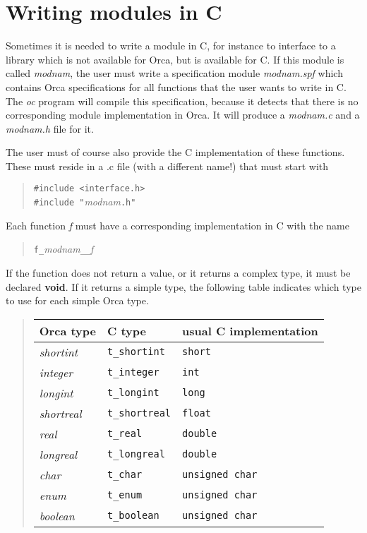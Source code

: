 \documentclass[10pt]{article}
\begin{document}

\section{Writing modules in C}\label{sec:interface}

Sometimes it is needed to write a module in C, for instance to interface
to a library which is not available for Orca, but is available for C.
If this module is called
{\em modnam},
the user must write a specification module
{\em modnam.spf}
which
contains Orca specifications for all functions that the user wants to write
in C.
The
{\em oc}
program will compile this specification, because it detects that there
is no corresponding module implementation in Orca.
It will produce a 
{\em modnam.c}
and a
{\em modnam.h}
file for it.

The user must of course also provide the C implementation of these functions.
These must reside in a .c file (with a different name!) that must
start with
\begin{quote}
\verb+#include <interface.h>+ \\
\verb+#include "+{\em modnam}\verb+.h"+
\end{quote}
Each function {\em f}
must have a corresponding implementation in C with the name
\begin{quote}
\verb+f_+{\em modnam}\verb+__+{\em f}
\end{quote}
If the function does not return a value, or it returns a complex type,
it must be declared
{\bf void}.
If it returns a simple type, the following table indicates which type
to use for each simple Orca type.

\begin{quote}
\begin{tabular}{|l|l|l|}\hline
{\bf Orca type} & {\bf C type} & {\bf usual C implementation} \\ \hline
{\em shortint} & \verb+t_shortint+ & \verb+short+ \\
{\em integer} & \verb+t_integer+ & \verb+int+ \\
{\em longint} & \verb+t_longint+ & \verb+long+ \\
{\em shortreal} & \verb+t_shortreal+ & \verb+float+ \\
{\em real} & \verb+t_real+ & \verb+double+ \\
{\em longreal} & \verb+t_longreal+ & \verb+double+ \\
{\em char} & \verb+t_char+ & \verb+unsigned char+ \\
{\em enum} & \verb+t_enum+ & \verb+unsigned char+ \\
{\em boolean} & \verb+t_boolean+ & \verb+unsigned char+ \\ \hline
\end{tabular}
\end{quote}
\end{document}
